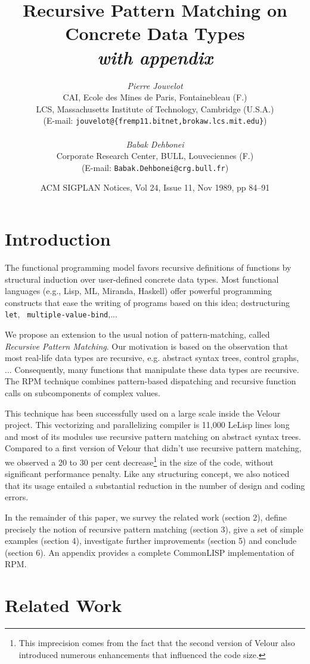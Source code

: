 \documentclass[a4paper,11pt]{article}
\title{Recursive Pattern Matching on Concrete Data Types \\ \emph{with appendix}}
\author{\emph{Pierre Jouvelot} \\
CAI, Ecole des Mines de Paris, Fontainebleau (F.) \\
LCS, Massachusetts Institute of Technology, Cambridge (U.S.A.) \\
({\small E-mail: \texttt{jouvelot@\{fremp11.bitnet,brokaw.lcs.mit.edu\}}}) \\
\\
\emph{Babak Dehbonei} \\
Corporate Research Center, BULL, Louveciennes (F.) \\
({\small E-mail: \texttt{Babak.Dehbonei@crg.bull.fr}})}
\date{ACM SIGPLAN Notices, Vol 24, Issue 11, Nov 1989, pp 84--91}
\begin{document}
\maketitle

\section{Introduction}

The functional programming model favors recursive definitions of
functions by structural induction over user-defined concrete data
types. Most functional languages (e.g., Lisp, ML, Miranda, Haskell)
offer powerful programming constructs that ease the writing of
programs based on this idea; destructuring \texttt{let}, {\tt
multiple-value-bind},... 

We propose an extension to the usual notion of pattern-matching,
called \emph{Recursive Pattern Matching}. Our motivation is based on
the observation that most real-life data types are recursive, e.g.
abstract syntax trees, control graphs, ...  Consequently, many
functions that manipulate these data types are recursive. The RPM
technique combines pattern-based dispatching and recursive function
calls on subcomponents of complex values.

This technique has been successfully used on a large scale inside the
Velour project. This vectorizing and parallelizing compiler is 11,000
LeLisp lines long and most of its modules use recursive pattern
matching on abstract syntax trees. Compared to a first version of
Velour that didn't use recursive pattern matching, we observed a 20 to
30 per cent decrease\footnote{This imprecision comes from the fact
that the second version of Velour also introduced numerous
enhancements that influenced the code size.} in the size of the code,
without significant performance penalty. Like any structuring concept,
we also noticed that its usage entailed a substantial reduction in the
number of design and coding errors.

In the remainder of this paper, we survey the related work (section
2), define precisely the notion of recursive pattern matching (section
3), give a set of simple examples (section 4), investigate further
improvements (section 5) and conclude (section 6). An appendix provides a
complete CommonLISP implementation of RPM.
 
\section{Related Work}
\end{document}
